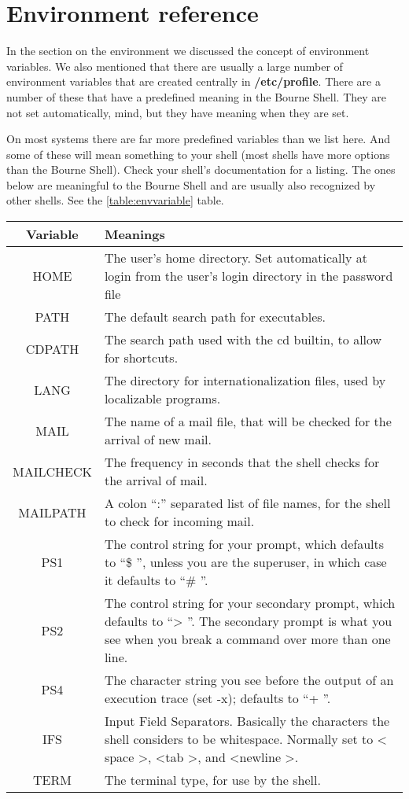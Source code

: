 \section{Environment reference}
In the section on the environment we discussed the concept of environment
variables. We also mentioned that there are usually a large number of
environment variables that are created centrally in \textbf{/etc/profile}.
There are a number of these that have a predefined meaning in the Bourne Shell.
They are not set automatically, mind, but they have meaning when they are set.

On most systems there are far more predefined variables than we list here. And
some of these will mean something to your shell (most shells have more options
than the Bourne Shell). Check your shell's documentation for a listing. The
ones below are meaningful to the Bourne Shell and are usually also recognized
by other shells. See the \ref{table:envvariable} table.

\begin{table*}[H]
	\begin{tabular}{|c|p{10cm}|}
		\hline
		\textbf{ Variable} & \textbf{ Meanings} \\ \hline
		 HOME &  The user's home directory. Set automatically at login from the user's login directory in the password file \\ \hline
		 PATH &  The default search path for executables. \\ \hline
		 CDPATH &  The search path used with the cd builtin, to allow for shortcuts. \\ \hline
		 LANG &  The directory for internationalization files, used by localizable programs. \\ \hline
		 MAIL &  The name of a mail file, that will be checked for the arrival of new mail. \\ \hline
		 MAILCHECK &  The frequency in seconds that the shell checks for the arrival of mail. \\ \hline
		 MAILPATH &  A colon “:” separated list of file names, for the shell to check for incoming mail. \\ \hline
		 PS1 &  The control string for your prompt, which defaults to “\$ ”,
unless you are the superuser, in which case it defaults to “\# ”. \\ \hline
		 PS2 &  The control string for your secondary prompt, which defaults to
“\textgreater{} ”. The secondary prompt is what you see when you break a
command over more than one line. \\ \hline
		 PS4 &  The character string you see before the output of an execution
trace (set -x); defaults to “+ ”. \\ \hline
		 IFS &  Input Field Separators. Basically the characters the shell
considers to be whitespace. Normally set to \textless{} space \textgreater{}, \textless tab \textgreater{}, and
\textless newline \textgreater{}. \\ \hline
		 TERM &  The terminal type, for use by the shell. \\ \hline
	\end{tabular}
	\caption{Bourne Shell environment variables}
	\label{table:envvariable}
\end{table*}
